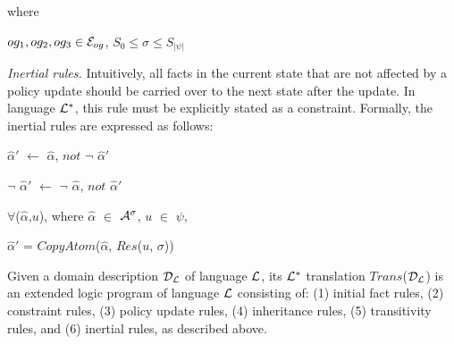 \documentclass[global,twocolumn,draft]{svjour}
\newenvironment{vdefinition}
  {\begin{definition}\hspace{0.25em}}
  {\end{definition}}
\newenvironment{vquote}
  {\begin{list}{}{\leftmargin 1em}\item[]}
  {\end{list}}
\begin{document}
\begin{itemize}
\begin{enumerate}
                  where
 
                  $og_{1}, og_{2}, og_{3} \in {\cal E}_{og}$,
                  $S_{0} \leq \sigma \leq S_{|\psi|}$
              \end{enumerate}

            \item
              {\em Inertial rules.}
              Intuitively, all facts in the current state that are not affected
              by a policy update should be carried over to the next state after
              the update. In language ${\cal L}^{*}$, this rule must be
              explicitly stated as a constraint. Formally, the inertial rules
              are expressed as follows:
 
              \begin{vquote}
                $\hat{\alpha}'$ $\leftarrow$ $\hat{\alpha}$, $not$ $\lnot$ $\hat{\alpha}'$
 
                $\lnot$ $\hat{\alpha}'$ $\leftarrow$ $\lnot$ $\hat{\alpha}$, $not$ $\hat{\alpha}'$
 
                $\forall$($\hat{\alpha}$,$u$), where
                $\hat{\alpha}$ $\in$ ${\cal A}^{\sigma}$,
                $u$ $\in$ $\psi$,
 
                $\hat{\alpha}'$ = $CopyAtom$($\hat{\alpha}$, $Res$($u$, $\sigma$))
              \end{vquote}
          \end{itemize}

        \begin{vdefinition}
          \label{def-trans}
          Given a domain description ${\cal D_{L}}$ of language ${\cal L}$, its
          ${\cal L^{*}}$ translation $Trans$(${\cal D_{L}}$) is an extended
          logic program of language ${\cal L}$ consisting of: (1) initial fact
          rules, (2) constraint rules, (3) policy update rules, (4) inheritance
          rules, (5) transitivity rules, and (6) inertial rules, as described
          above.
        \end{vdefinition}
\end{document}
